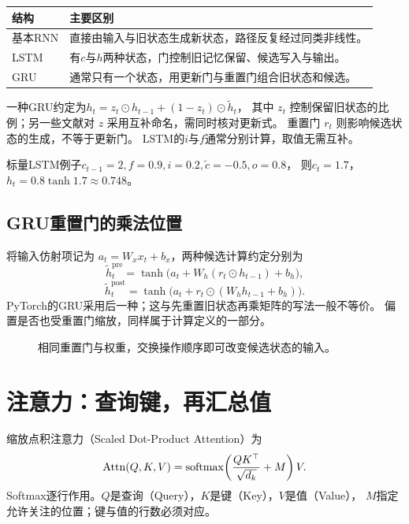 \begin{center}
\begin{tabularx}{\textwidth}{P{31mm}Y}
\toprule
结构 & 主要区别\\
\midrule
基本RNN & 直接由输入与旧状态生成新状态，路径反复经过同类非线性。\\
LSTM & 有$c$与$h$两种状态，门控制旧记忆保留、候选写入与输出。\\
GRU & 通常只有一个状态，用更新门与重置门组合旧状态和候选。\\
\bottomrule
\end{tabularx}
\end{center}

一种GRU约定为$h_t=z_t\odot h_{t-1}+(1-z_t)\odot\widetilde h_t$，
其中 $z_t$ 控制保留旧状态的比例；另一些文献对 $z$ 采用互补命名，需同时核对更新式。
重置门 $r_t$ 则影响候选状态的生成，不等于更新门。
LSTM的$i$与$f$通常分别计算，取值无需互补。

标量LSTM例子$c_{t-1}=2,f=0.9,i=0.2,\widetilde c=-0.5,o=0.8$，
则$c_t=1.7$，$h_t=0.8\tanh1.7\approx0.748$。

\subsection{GRU重置门的乘法位置}
\label{sec:seq-gru-reset}
将输入仿射项记为 $a_t=W_xx_t+b_x$，两种候选计算约定分别为
\[
 \widetilde h_t^{\mathrm{pre}}=\tanh\!\bigl(a_t+W_h(r_t\odot h_{t-1})+b_h\bigr),
\]
\[
 \widetilde h_t^{\mathrm{post}}=\tanh\!\bigl(a_t+r_t\odot(W_hh_{t-1}+b_h)\bigr).
\]
PyTorch的GRU采用后一种；这与先重置旧状态再乘矩阵的写法一般不等价。
偏置是否也受重置门缩放，同样属于计算定义的一部分。

\begin{figure}[htbp]
\centering
\caption{相同重置门与权重，交换操作顺序即可改变候选状态的输入。}
\par\smallskip
{}
\end{figure}


\section{注意力：查询键，再汇总值}
\label{sec:seq-attention}
缩放点积注意力（Scaled Dot-Product Attention）为
\[
 \operatorname{Attn}(Q,K,V)=\operatorname{softmax}\!\left(\frac{QK^\top}{\sqrt{d_k}}+M\right)V.
\]
Softmax逐行作用。$Q$是查询（Query），$K$是键（Key），$V$是值（Value），
$M$指定允许关注的位置；键与值的行数必须对应。

